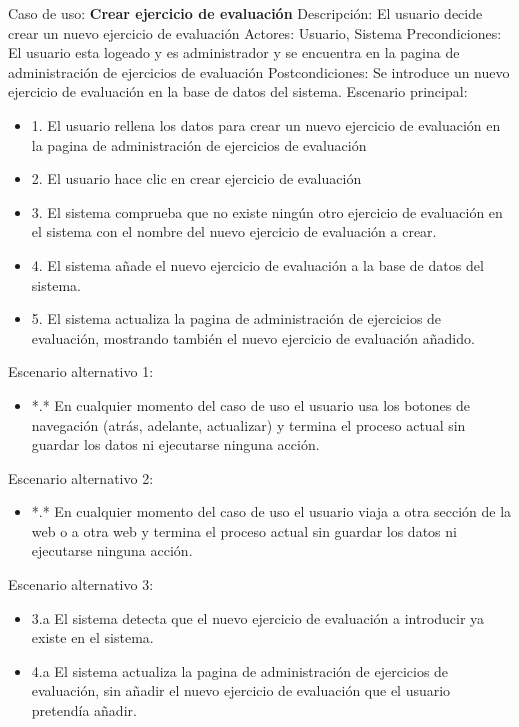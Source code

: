 Caso de uso: \textbf{Crear ejercicio de evaluación}
\newline
Descripción: El usuario decide crear un nuevo ejercicio de evaluación
\newline
Actores: Usuario, Sistema
\newline
Precondiciones: El usuario esta logeado y es administrador y se encuentra en la pagina de administración de ejercicios de evaluación
\newline
Postcondiciones: Se introduce un nuevo ejercicio de evaluación en la base de datos del sistema.
\newline
Escenario principal:
\begin{itemize}
	\item 1. El usuario rellena los datos para crear un nuevo ejercicio de evaluación en la pagina de administración de ejercicios de evaluación
	\item 2. El usuario hace clic en crear ejercicio de evaluación
	\item 3. El sistema comprueba que no existe ningún otro ejercicio de evaluación en el sistema con el nombre del nuevo ejercicio de evaluación a crear.
	\item 4. El sistema añade el nuevo ejercicio de evaluación a la base de datos del sistema.
	\item 5. El sistema actualiza la pagina de administración de ejercicios de evaluación, mostrando también el nuevo ejercicio de evaluación añadido.
\end{itemize}
Escenario alternativo 1: 
\begin{itemize}
	\item *.* En cualquier momento del caso de uso el usuario usa los botones de navegación (atrás, adelante, actualizar) y termina el proceso actual sin guardar los datos ni ejecutarse ninguna acción.
\end{itemize}
Escenario alternativo 2:
\begin{itemize}
	\item *.* En cualquier momento del caso de uso el usuario viaja a otra sección de la web o a otra web y termina el proceso actual sin guardar los datos ni ejecutarse ninguna acción.
\end{itemize}
Escenario alternativo 3:
\begin{itemize}
	\item 3.a El sistema detecta que el nuevo ejercicio de evaluación a introducir ya existe en el sistema.
	\item 4.a El sistema actualiza la pagina de administración de ejercicios de evaluación, sin añadir el nuevo ejercicio de evaluación que el usuario pretendía añadir.
\end{itemize}

